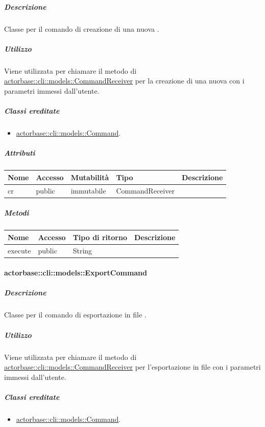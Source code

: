 \documentclass{scalatekids-article}
\begin{document}
\subparagraph{Descrizione}

Classe per il comando di creazione di una nuova .

\subparagraph{Utilizzo}

Viene utilizzata per chiamare il metodo di
\hyperref[sec:actorbase::cli::models::CommandReceiver]{actorbase::cli::models::CommandReceiver} per la creazione di una nuova
 con i parametri immessi dall'utente.

\subparagraph{Classi ereditate}

\begin{itemize}
\item \hyperref[sec:actorbase::cli::models::Command]{actorbase::cli::models::Command}.
\end{itemize}

\subparagraph{Attributi}

\begin{tabular}{| l | l | l | l | l |}
	\hline
	Nome & Accesso & Mutabilità & Tipo & Descrizione\\
	\hline
	cr & public & immutabile & CommandReceiver & \\
	\hline
\end{tabular}

\subparagraph{Metodi}

\begin{tabular}{| l | l | l | l |}
	\hline
	Nome & Accesso & Tipo di ritorno & Descrizione\\
	\hline
	execute & public & String & \\
	\hline
\end{tabular}

\paragraph{actorbase::cli::models::ExportCommand}
\label{sec:actorbase::cli::models::ExportCommand}

\subparagraph{Descrizione}

Classe per il comando di esportazione in file .

\subparagraph{Utilizzo}

Viene utilizzata per chiamare il metodo di
\hyperref[sec:actorbase::cli::models::CommandReceiver]{actorbase::cli::models::CommandReceiver} per l'esportazione in file
 con i parametri immessi dall'utente.

\subparagraph{Classi ereditate}

\begin{itemize}
\item \hyperref[sec:actorbase::cli::models::Command]{actorbase::cli::models::Command}.
\end{itemize}
\end{document}
